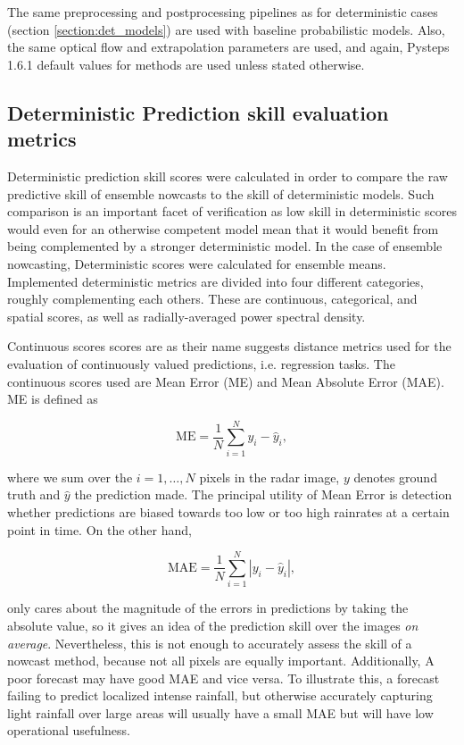 The same preprocessing and postprocessing pipelines as for deterministic cases (section \ref{section:det_models}) are used with baseline probabilistic models. Also, the same optical flow and extrapolation parameters are used, and again, Pysteps 1.6.1 default values for methods are used unless stated otherwise. 


\subsection{Deterministic Prediction skill evaluation metrics}

Deterministic prediction skill scores were calculated in order to compare the raw predictive skill of ensemble nowcasts to the skill of deterministic models. Such comparison is an important facet of verification as low skill in deterministic scores would even for an otherwise competent model mean that it would benefit from being complemented by a stronger deterministic model. In the case of ensemble nowcasting, Deterministic scores were calculated for ensemble means. Implemented deterministic metrics are divided into four different categories, roughly complementing each others. These are continuous, categorical, and spatial scores, as well as radially-averaged power spectral density.  

Continuous scores scores are as their name suggests distance metrics used for the evaluation of continuously valued predictions, i.e. regression tasks. The continuous scores used are Mean Error (ME) and Mean Absolute Error (MAE). ME is defined as 

\begin{equation}
	\text{ME} = \frac{1}{N}\sum_{i=1}^{N} y_i - \hat{y}_i,
\end{equation}

where we sum over the $i=1,\dots,N$ pixels in the radar image, $y$ denotes ground truth and $\hat{y}$ the prediction made. The principal utility of Mean Error is detection whether predictions are biased towards too low or too high rainrates at a certain point in time. On the other hand, 

\begin{equation}
	\text{MAE} = \frac{1}{N}\sum_{i=1}^{N} |y_i - \hat{y}_i|,
\end{equation}

only cares about the magnitude of the errors in predictions by taking the absolute value, so it gives an idea of the prediction skill over the images \textit{on average}. Nevertheless, this is not enough to accurately assess the skill of a nowcast method, because not all pixels are equally important. Additionally, A poor forecast may have good MAE and vice versa. To illustrate this, a forecast failing to predict localized intense rainfall, but otherwise accurately capturing light rainfall over large areas will usually have a small MAE but will have low operational usefulness.


